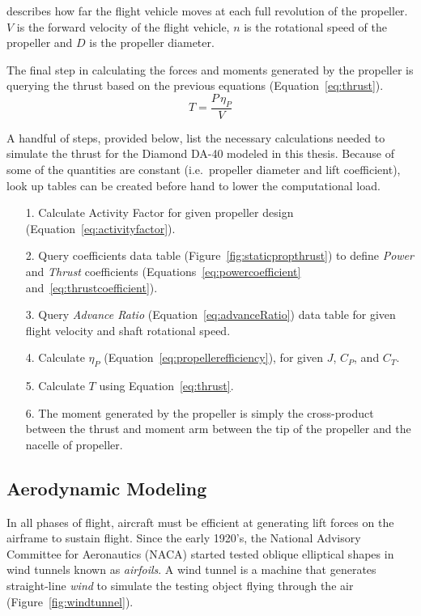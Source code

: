 \documentclass[12pt]{report}
\begin{document}
describes how far the flight vehicle moves at each full revolution of the propeller.
\(V\) is the forward velocity of the flight vehicle, \(n\) is the rotational speed of the propeller and \(D\) is the propeller diameter.

The final step in calculating the forces and moments generated by the propeller is querying the thrust based on the previous equations (Equation~\ref{eq:thrust}).
\begin{equation}\label{eq:thrust}
  T = \frac{P \, \eta_P}{V}
\end{equation}

A handful of steps, provided below, list the necessary calculations needed to simulate the thrust for the Diamond DA-40 modeled in this thesis. Because of some of the quantities are constant (i.e.\ propeller diameter and lift coefficient), look up tables can be created before hand to lower the computational load.

\begin{itemize}
  \item[1.] Calculate Activity Factor for given propeller design (Equation~\ref{eq:activityfactor}).
  \item[2.] Query coefficients data table (Figure~\ref{fig:staticpropthrust}) to define \textit{Power} and \textit{Thrust} coefficients (Equations~\ref{eq:powercoefficient} and~\ref{eq:thrustcoefficient}).
  \item[3.] Query \textit{Advance Ratio} (Equation~\ref{eq:advanceRatio}) data table for given flight velocity and shaft rotational speed.
  \item[4.] Calculate \( \eta_P \) (Equation~\ref{eq:propellerefficiency}), for given \(J\), \(C_P\), and \(C_T\).
  \item[5.] Calculate \(T\) using Equation~\ref{eq:thrust}.
  \item[6.] The moment generated by the propeller is simply the cross-product between the thrust and moment arm between the tip of the propeller and the nacelle of propeller.
\end{itemize}

\subsection{Aerodynamic Modeling}\label{section:aerodynamic}
In all phases of flight, aircraft must be efficient at generating lift forces on the airframe to sustain flight. Since the early 1920's, the National Advisory Committee for Aeronautics (NACA) started tested oblique elliptical shapes in wind tunnels known as \textit{airfoils}. A wind tunnel is a machine that generates straight-line \textit{wind} to simulate the testing object flying through the air (Figure~\ref{fig:windtunnel}).
\end{document}
